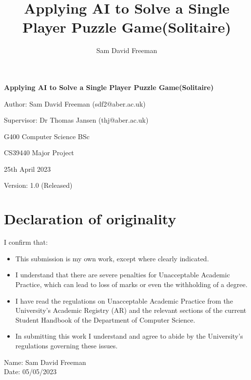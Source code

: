\documentclass[a4paper,11pt]{article}
\title{Applying AI to Solve a Single Player Puzzle Game(Solitaire)}
\author{Sam David Freeman}
\begin{document}
\begin{center}
	\textbf{{\Large Applying AI to Solve a Single Player Puzzle Game(Solitaire)}}
\end{center}
\begin{center}
	Author: Sam David Freeman (sdf2@aber.ac.uk)
\end{center}
\begin{center}
	Supervisor: Dr Thomas Jansen (thj@aber.ac.uk)
\end{center} 
\begin{center}
	G400 Computer Science BSc
\end{center}
\begin{center}
	CS39440 Major Project
\end{center}
\begin{center}
	25th April 2023
\end{center}
\begin{center}
	Version: 1.0 (Released)
\end{center}
\newpage




\section*{\centering Declaration of originality}

I confirm that:

\begin{itemize}
	\item{This submission is my own work, except where 
		clearly indicated.}
	
	\item{I understand that there are severe penalties for Unacceptable Academic Practice, which can lead to loss of marks or even the withholding of a degree.}
	
	\item{I have read the regulations on Unacceptable Academic Practice from the University's Academic Registry (AR) and the relevant sections of the current Student Handbook of the Department of Computer Science.}
	
	\item{In submitting this work I understand and agree to abide by the University's regulations governing these issues.}
\end{itemize}

\vspace{2em}
Name: Sam David Freeman  \\

\vspace{1em}
Date: 05/05/2023 \\
\newpage
\end{document}
